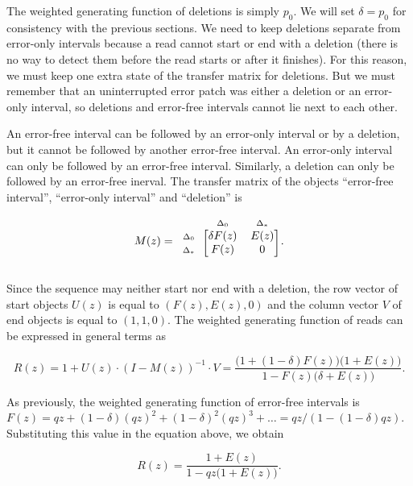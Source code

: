 \documentclass{article}
\newcommand{\smDELz}{\scriptstyle{\Delta_0}}
\newcommand{\smDELs}{\scriptstyle{\Delta_*}}
\begin{document}
The weighted generating function of deletions is simply $p_0$. We will set
$\delta = p_0$ for consistency with the previous sections. We need to keep
deletions separate from error-only intervals because a read cannot start
or end with a deletion (there is no way to detect them before the read
starts or after it finishes). For this reason, we must keep one extra
state of the transfer matrix for deletions. But we must remember that an
uninterrupted error patch was either a deletion or an error-only interval,
so deletions and error-free intervals cannot lie next to each other.

An error-free interval can be followed by an error-only interval or by a
deletion, but it cannot be followed by another error-free interval. An
error-only interval can only be followed by an error-free interval.
Similarly, a deletion can only be followed by an error-free inerval. The
transfer matrix of the objects ``error-free interval'', ``error-only
interval'' and ``deletion'' is


\begin{equation*}
M(z) = 
\begin{blockarray}{ccc}
       & \smDELz & \smDELs \\
\begin{block}{c[cc]}
\smDELz & \delta F(z)  & E(z) \\
\smDELs & F(z)         & 0    \\
\end{block}
\end{blockarray}.
\end{equation*}

Since the sequence may neither start nor end with a deletion, the row
vector of start objects $U(z)$ is equal to $(F(z), E(z), 0)$ and the
column vector $V$ of end objects is equal to $(1,1,0)$. The weighted
generating function of reads can be expressed in general terms as

\begin{equation}
\label{eq:Remp_gen}
R(z) = 1 + U(z) \cdot (I-M(z))^{-1} \cdot V =
\frac{\big(1+(1-\delta)F(z)\big)\big(1+E(z)\big)}
   {1-F(z)\big(\delta+E(z)\big)}.
\end{equation}

As previously, the weighted generating function of error-free intervals is
$F(z) = qz + (1-\delta)(qz)^2 + (1-\delta)^2(qz)^3 + \ldots =
qz/(1-(1-\delta)qz)$. Substituting this value in the equation above, we
obtain

\begin{equation}
\label{eq:Remp}
R(z) = \frac{1+E(z)}{1-qz\big(1+E(z)\big)}.
\end{equation}
\end{document}
